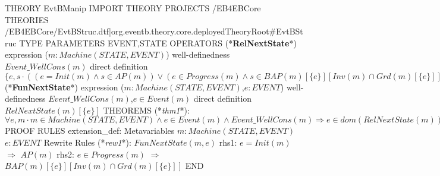 THEORY EvtBManip
  IMPORT THEORY PROJECTS
    /EB4EBCore THEORIES /EB4EBCore/EvtBStruc.dtf|org.eventb.theory.core.deployedTheoryRoot#EvtBStruc
  TYPE PARAMETERS EVENT,STATE
  OPERATORS
    (*\textbf{RelNextState}*) expression ($m:\mathit{Machine}(\mathit{STATE},\mathit{EVENT})$)
      well-definedness $\mathit{Event\_WellCons}(m)$
      direct definition 
        $\{ e,s\cdot((e=\mathit{Init}(m)\wedge s\in\mathit{AP}(m))\vee(e\in\mathit{Progress}(m)\wedge s\in\mathit{BAP}(m)[\{ e\}][\mathit{Inv}(m)\cap\mathit{Grd}(m)[\{ e\}]]))\mid e\mapsto s\}$
    (*\textbf{FunNextState}*) expression ($m:\mathit{Machine}(\mathit{STATE},\mathit{EVENT})$,$e:\mathit{EVENT}$)
      well-definedness $\mathit{Event\_WellCons}(m)$,$e\in\mathit{Event}(m)$
      direct definition 
        $\mathit{RelNextState}(m)[\{ e\}]$
  THEOREMS
    (*\textit{thm1}*): 
      $\forall e,m\cdot m\in\mathit{Machine}(\mathit{STATE},\mathit{EVENT})\wedge e\in\mathit{Event}(m)\wedge\mathit{Event\_WellCons}(m)\Rightarrow e\in\mathit{dom}(\mathit{RelNextState}(m))$
  PROOF RULES
    extension_def:
    Metavariables
      $m:\mathit{Machine}(\mathit{STATE},\mathit{EVENT})$
      $e:\mathit{EVENT}$
    Rewrite Rules
      (*\textit{rew1}*): $\mathit{FunNextState}(m,e)$
        rhs1: $e=\mathit{Init}(m)$ $\Rightarrow$ $\mathit{AP}(m)$
        rhs2: $e\in\mathit{Progress}(m)$ $\Rightarrow$ $\mathit{BAP}(m)[\{ e\}][\mathit{Inv}(m)\cap\mathit{Grd}(m)[\{ e\}]]$
END
